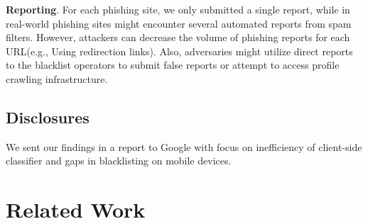 \documentclass[letterpaper,twocolumn,10pt]{article}
\begin{document}
\textbf{Reporting}. For each phishing site, we only submitted a single report, while in real-world phishing sites might encounter several automated reports from spam filters. However,  attackers can decrease the volume of phishing reports for each URL(e.g., Using redirection links).
Also, adversaries might utilize direct reports to the blacklist
operators to submit false reports or attempt to access profile crawling infrastructure.

\subsection{Disclosures}

We sent our findings in a report to Google with focus on inefficiency of client-side classifier and gaps in blacklisting on mobile devices. 


\section{Related Work}









\end{document}
